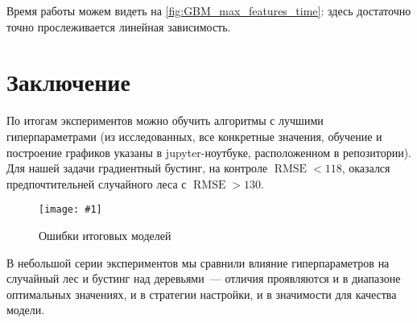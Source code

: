 \documentclass[12pt]{article}
\newcommand{\mpl}[2]{
    \begin{figure}[!h]
        \texttt{[image: \#1]}
        \centering
        \caption{#2}
        \label{fig:#1}
     \end{figure}
}
\begin{document}
Время работы можем видеть на \autoref{fig:GBM_max_features_time}: здесь достаточно точно прослеживается линейная зависимость.

\section{Заключение}
По итогам экспериментов можно обучить алгоритмы с лучшими гиперпараметрами (из исследованных, все конкретные значения, обучение и построение графиков указаны в jupyter-ноутбуке, расположенном в репозитории).
Для нашей задачи градиентный бустинг, на контроле $\operatorname{RMSE}<118$, оказался предпочтительней случайного леса с $\operatorname{RMSE}>130$.
\mpl{conclusion}{Ошибки итоговых моделей}
\newpage
В небольшой серии экспериментов мы сравнили влияние гиперпараметров на случайный лес и бустинг над деревьями~--- отличия проявляются и в диапазоне оптимальных значениях, и в стратегии настройки, и в значимости для качества модели. 
\end{document}
